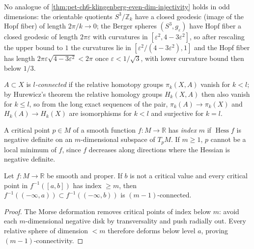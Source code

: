 \begin{remark}
  \label{rem:pet-ch6-klingenberg-odd-dim-counterexample}


  No analogue of \cref{thm:pet-ch6-klingenberg-even-dim-injectivity} holds in
  odd dimensions: the orientable quotients $S^3/\mathbb{Z}_k$ have a closed
  geodesic (image of the Hopf fiber) of length $2\pi/k\to0$; the Berger
  spheres $(S^3,g_\varepsilon)$ have Hopf fiber a closed geodesic of length
  $2\pi\varepsilon$ with curvatures in $[\varepsilon^2,4-3\varepsilon^2]$, so
  after rescaling the upper bound to $1$ the curvatures lie in
  $[\varepsilon^2/(4-3\varepsilon^2),1]$ and the Hopf fiber has length
  $2\pi\varepsilon\sqrt{4-3\varepsilon^2}<2\pi$ once $\varepsilon<1/\sqrt3$,
  with lower curvature bound then below $1/3$.
\end{remark}

\begin{definition}
  \label{def:pet-ch6-l-connected}

  $A\subset X$ is \emph{$l$-connected} if the relative homotopy groups
  $\pi_k(X,A)$ vanish for $k<l$; by Hurewicz's theorem the relative homology
  groups $H_k(X,A)$ then also vanish for $k\le l$, so from the long exact
  sequences of the pair, $\pi_k(A)\to\pi_k(X)$ and $H_k(A)\to H_k(X)$ are
  isomorphisms for $k<l$ and surjective for $k=l$.
\end{definition}

\begin{definition}
  \label{def:pet-ch6-critical-point-index}

  A critical point $p\in M$ of a smooth function $f:M\to\mathbb{R}$ has \emph{index}
  $m$ if $\operatorname{Hess}f$ is negative definite on an $m$-dimensional subspace of
  $T_pM$. If $m\ge1$, $p$ cannot be a local minimum of $f$, since $f$
  decreases along directions where the Hessian is negative definite.
\end{definition}

\begin{theorem}
  \label{thm:pet-ch6-morse-connectivity}


  Let $f:M\to\mathbb{R}$ be smooth and proper. If $b$ is not a critical value and
  every critical point in $f^{-1}([a,b])$ has index $\ge m$, then
  $f^{-1}((-\infty,a))\subset f^{-1}((-\infty,b))$ is $(m-1)$-connected.
\end{theorem}
\begin{proof}
  \sketch
  The Morse deformation removes critical points of index below \(m\): avoid each \(m\)-dimensional negative disk by transversality and push radially out. Every relative sphere of dimension \(<m\) therefore deforms below level \(a\), proving \((m-1)\)-connectivity.
\end{proof}

